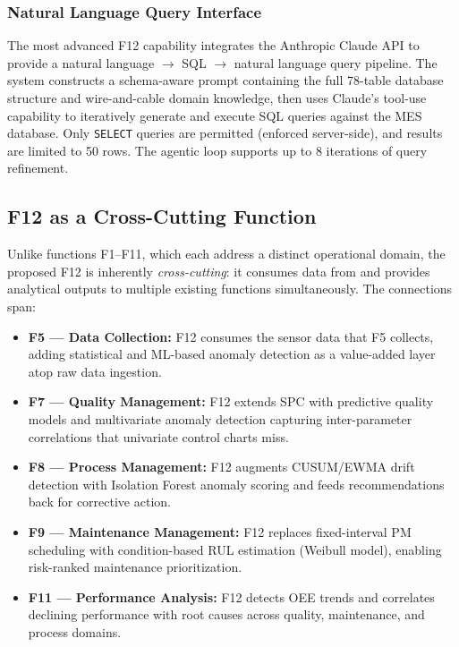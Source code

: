 \documentclass[11pt]{article}
\begin{document}
\subsubsection{Natural Language Query Interface}

The most advanced F12 capability integrates the Anthropic Claude API to provide a natural language $\to$ SQL $\to$ natural language query pipeline.  The system constructs a schema-aware prompt containing the full 78-table database structure and wire-and-cable domain knowledge, then uses Claude's tool-use capability to iteratively generate and execute SQL queries against the MES database.  Only \texttt{SELECT} queries are permitted (enforced server-side), and results are limited to 50 rows.  The agentic loop supports up to 8 iterations of query refinement.


\subsection{F12 as a Cross-Cutting Function}

Unlike functions F1--F11, which each address a distinct operational domain, the proposed F12 is inherently \textit{cross-cutting}: it consumes data from and provides analytical outputs to multiple existing functions simultaneously.  The connections span:

\begin{itemize}[leftmargin=2em, itemsep=1pt]
\item \textbf{F5 --- Data Collection:} F12 consumes the sensor data that F5 collects, adding statistical and ML-based anomaly detection as a value-added layer atop raw data ingestion.
\item \textbf{F7 --- Quality Management:} F12 extends SPC with predictive quality models and multivariate anomaly detection capturing inter-parameter correlations that univariate control charts miss.
\item \textbf{F8 --- Process Management:} F12 augments CUSUM/EWMA drift detection with Isolation Forest anomaly scoring and feeds recommendations back for corrective action.
\item \textbf{F9 --- Maintenance Management:} F12 replaces fixed-interval PM scheduling with condition-based RUL estimation (Weibull model), enabling risk-ranked maintenance prioritization.
\item \textbf{F11 --- Performance Analysis:} F12 detects OEE trends and correlates declining performance with root causes across quality, maintenance, and process domains.
\end{itemize}
\end{document}

